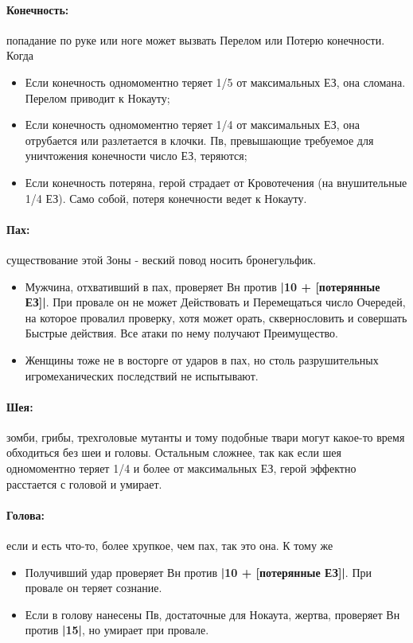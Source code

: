 \paragraph{Конечность:} попадание по руке или ноге может вызвать Перелом или Потерю конечности. Когда
\begin{itemize}
  \item Если конечность одномоментно теряет 1/5 от максимальных ЕЗ, она сломана. Перелом приводит к Нокауту;
  \item Если конечность одномоментно теряет  1/4 от максимальных ЕЗ, она отрубается или разлетается в клочки. Пв, превышающие требуемое для уничтожения конечности число ЕЗ, теряются;
  \item Если конечность потеряна, герой страдает от Кровотечения (на внушительные 1/4 ЕЗ). Само собой, потеря конечности ведет к Нокауту.
\end{itemize}
\paragraph{Пах:} существование этой Зоны - веский повод носить бронегульфик.
\begin{itemize}
  \item Мужчина, отхвативший в пах, проверяет Вн против \textbf{|10 + [потерянные ЕЗ]|}. При провале он не может Действовать и Перемещаться число Очередей, на которое провалил проверку, хотя может орать, сквернословить и совершать Быстрые действия. Все атаки по нему получают Преимущество.
  \item Женщины тоже не в восторге от ударов в пах, но столь разрушительных игромеханических последствий не испытывают. 
\end{itemize}
\paragraph{Шея:} зомби, грибы, трехголовые мутанты и тому подобные твари могут какое-то время обходиться без шеи и головы.
\newline Остальным сложнее, так как если шея одномоментно теряет 1/4 и более от максимальных ЕЗ, герой эффектно расстается с головой и умирает.
\paragraph{Голова:} если и есть что-то, более хрупкое, чем пах, так это она. К тому же
\begin{itemize}
  \item Получивший удар проверяет Вн против \textbf{|10 + [потерянные ЕЗ]|}. При провале он теряет сознание.
  \item Если в голову нанесены Пв, достаточные для Нокаута, жертва, проверяет Вн против \textbf{|15|}, но умирает при провале.
\end{itemize}
